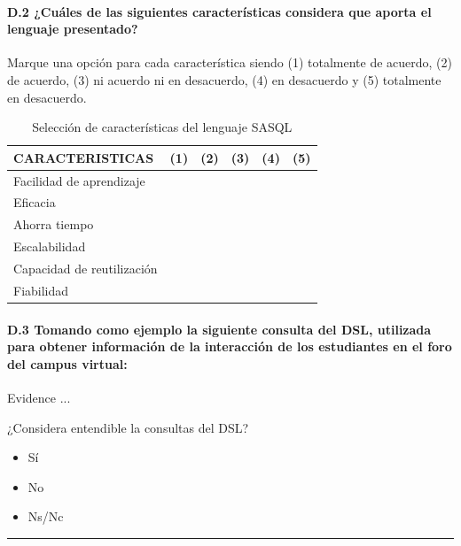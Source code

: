 	\paragraph*{D.2 ¿Cuáles de las siguientes características considera que aporta el lenguaje presentado?}

Marque una opción para cada característica siendo (1) totalmente de acuerdo, (2) de acuerdo, (3) ni acuerdo ni en desacuerdo, (4) en desacuerdo y (5) totalmente en desacuerdo.

\begin{table}[H]
  \begin{center}
  \begin{tabular}{| m{5cm} | c | c | c | c | c |}
    \hline
    CARACTERISTICAS & (1) & (2) & (3) & (4) & (5) \\
    \hline
    \hline
    Facilidad de aprendizaje &  &  & & & \\
    \hline
    Eficacia &  &  & & & \\
    \hline
    Ahorra tiempo &  & & & &  \\
    \hline
    Escalabilidad &  & & & &  \\
    \hline
    Capacidad de reutilización &  &  & & &  \\
    \hline
    Fiabilidad &  &  & & & \\
    \hline
  \end{tabular}
\end{center}
\caption{Selección de características del lenguaje SASQL}
\label{tab:ap:caracteristicas:sasql}
\end{table}

\newpage

	\paragraph*{D.3 Tomando como ejemplo la siguiente consulta del DSL, utilizada para obtener información de la interacción de los estudiantes en el foro del campus virtual:}
	Evidence ...
\begin{mdframed}[style=cuestionarioST]
	¿Considera entendible la consultas del DSL?
			\begin{itemize}
				\item Sí
				\item No
				\item Ns/Nc
			\end{itemize}

			\rule{30mm}{1pt} \newline
\end{mdframed}



